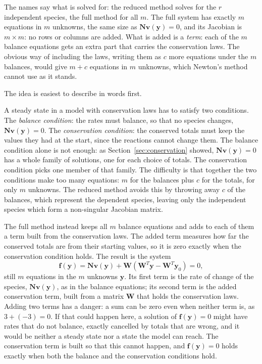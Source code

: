 \documentclass[11pt,a4paper,openany]{report}
\begin{document}
{{The names say what is solved for: the reduced method solves for the $r$
independent species, the full method for all $m$. The full system has
exactly $m$ equations in $m$ unknowns, the same size as $\mathbf{N}
\mathbf{v}(\mathbf{y}) = 0$, and its Jacobian is $m \times m$: no rows or
columns are added. What is added is a \emph{term}: each of the $m$ balance
equations gets an extra part that carries the conservation laws. The
obvious way of including the laws, writing them as $c$ more equations under
the $m$ balances, would give $m + c$ equations in $m$ unknowns, which
Newton's method cannot use as it stands.

The idea is easiest to describe in words first.

A steady state in a model with conservation laws has to satisfy two
conditions. The \emph{balance condition}: the rates must balance, so that
no species changes, $\mathbf{N} \mathbf{v}(\mathbf{y}) = 0$. The
\emph{conservation condition}: the conserved totals must keep the values
they had at the start, since the reactions cannot change them. The
balance condition alone is not enough: as
Section~\ref{sec:conservation} showed, $\mathbf{N} \mathbf{v}(\mathbf{y}) = 0$ has a whole family
of solutions, one for each choice of totals. The conservation condition picks one
member of that family. The difficulty is that together the two conditions
make too many equations: $m$ for the balances plus $c$ for the totals, for
only $m$ unknowns. The reduced method avoids this by throwing away $c$
of the balances, which represent the dependent species, leaving only the independent species which form a non-singular Jacobian matrix.

The full method instead keeps all $m$ balance equations and adds to each of
them a term built from the conservation laws. The added term measures how
far the conserved totals are from their starting values, so it is zero
exactly when the conservation condition holds. The result is the system
\[
  \mathbf{f}(\mathbf{y}) = \mathbf{N} \mathbf{v}(\mathbf{y})
    + \mathbf{W} (\mathbf{W}^T \mathbf{y} - \mathbf{W}^T \mathbf{y}_0) = 0 ,
\]
still $m$ equations in the $m$ unknowns $\mathbf{y}$. Its first term is the
rate of change of the species, $\mathbf{N} \mathbf{v}(\mathbf{y})$, as in
the balance equations; its second term is the added conservation term,
built from a matrix $\mathbf{W}$ that holds the conservation laws. Adding two
terms has a danger: a sum can be zero even when neither term is, as
$3 + (-3) = 0$. If that could happen here, a solution of
$\mathbf{f}(\mathbf{y}) = 0$ might have rates that do not balance, exactly
cancelled by totals that are wrong, and it would be neither a steady state
nor a state the model can reach. The conservation term is built so that
this cannot happen,
and $\mathbf{f}(\mathbf{y}) = 0$ holds exactly when both the balance and the
conservation conditions hold.

}}
\end{document}
